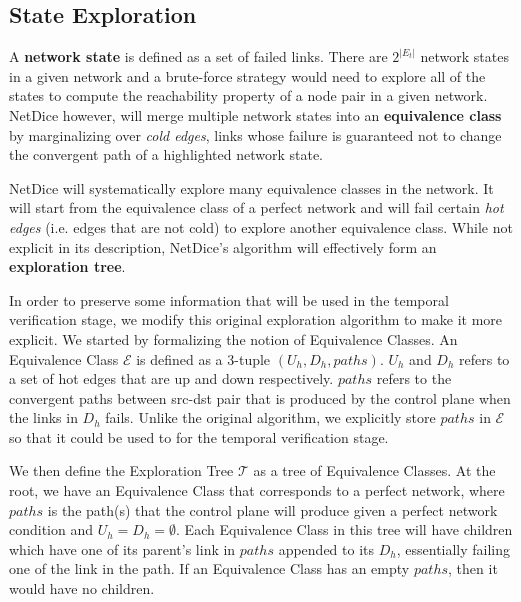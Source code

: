\documentclass[10pt,sigconf,letterpaper,anonymous,nonacm]{acmart}
\begin{document}

\subsection{State Exploration}
A \textbf{network state} is defined as a set of failed links.
There are $2^{|E_t|}$ network states in a given network and a brute-force strategy 
would need to explore all of the states to compute the reachability property of a 
node pair in a given network. 
NetDice however, will merge multiple network states into an \textbf{equivalence class}
by marginalizing over \textit{cold edges}, links whose failure is guaranteed not to 
change the convergent path of a highlighted network state.

NetDice will systematically explore many equivalence classes in the network. 
It will start from the equivalence class of a perfect network and will fail certain 
\textit{hot edges} (i.e. edges that are not cold) to explore another equivalence 
class.
While not explicit in its description, NetDice's algorithm will effectively form an 
\textbf{exploration tree}. 

In order to preserve some information that will be used in the temporal verification 
stage, we modify this original exploration algorithm to make it more explicit.
We started by formalizing the notion of Equivalence Classes.
An Equivalence Class $\mathcal{E}$ is defined as a 3-tuple $(U_h, D_h, paths)$.
$U_h$ and $D_h$ refers to a set of hot edges that are up and down respectively.
$paths$ refers to the convergent paths between src-dst pair that is produced by the
control plane when the links in $D_h$ fails.
Unlike the original algorithm, we explicitly store $paths$ in $\mathcal{E}$ so that 
it could be used to for the temporal verification stage.

We then define the Exploration Tree $\mathcal{T}$ as a tree of Equivalence Classes.
At the root, we have an Equivalence Class that corresponds to a perfect network, where 
$paths$ is the path(s) that the control plane will produce given a perfect network 
condition and $U_h = D_h = \emptyset$.
Each Equivalence Class in this tree will have children which have one of its parent's link in 
$paths$ appended to its $D_h$, essentially failing one of the link in the path.
If an Equivalence Class has an empty $paths$, then it would have no children.
\end{document}
